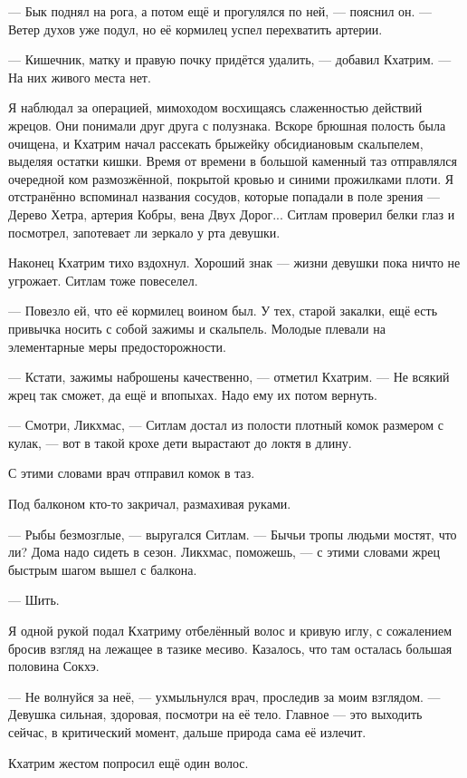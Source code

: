 --- Бык поднял на рога, а потом ещё и прогулялся по ней, --- пояснил он.
--- Ветер духов уже подул, но её кормилец успел перехватить артерии.

--- Кишечник, матку и правую почку придётся удалить, --- добавил Кхатрим.
--- На них живого места нет.

Я наблюдал за операцией, мимоходом восхищаясь слаженностью действий жрецов.
Они понимали друг друга с полузнака.
Вскоре брюшная полость была очищена, и Кхатрим начал рассекать брыжейку обсидиановым скальпелем, выделяя остатки кишки.
Время от времени в большой каменный таз отправлялся очередной ком размозжённой, покрытой кровью и синими прожилками плоти.
Я отстранённо вспоминал названия сосудов, которые попадали в поле зрения --- Дерево Хетра, артерия Кобры, вена Двух Дорог...
Ситлам проверил белки глаз и посмотрел, запотевает ли зеркало у рта девушки.

Наконец Кхатрим тихо вздохнул.
Хороший знак --- жизни девушки пока ничто не угрожает.
Ситлам тоже повеселел.

--- Повезло ей, что её кормилец воином был.
У тех, старой закалки, ещё есть привычка носить с собой зажимы и скальпель.
Молодые плевали на элементарные меры предосторожности.

--- Кстати, зажимы наброшены качественно, --- отметил Кхатрим.
--- Не всякий жрец так сможет, да ещё и впопыхах.
Надо ему их потом вернуть.

--- Смотри, Ликхмас, --- Ситлам достал из полости плотный комок размером с кулак, --- вот в такой крохе дети вырастают до локтя в длину.

С этими словами врач отправил комок в таз.

Под балконом кто-то закричал, размахивая руками.

--- Рыбы безмозглые, --- выругался Ситлам.
--- Бычьи тропы людьми мостят, что ли?
Дома надо сидеть в сезон.
Ликхмас, поможешь, --- с этими словами жрец быстрым шагом вышел с балкона.

--- Шить.

Я одной рукой подал Кхатриму отбелённый волос и кривую иглу, с сожалением бросив взгляд на лежащее в тазике месиво.
Казалось, что там осталась большая половина Сокхэ.

--- Не волнуйся за неё, --- ухмыльнулся врач, проследив за моим взглядом.
--- Девушка сильная, здоровая, посмотри на её тело.
Главное --- это выходить сейчас, в критический момент, дальше природа сама её излечит.

Кхатрим жестом попросил ещё один волос.

